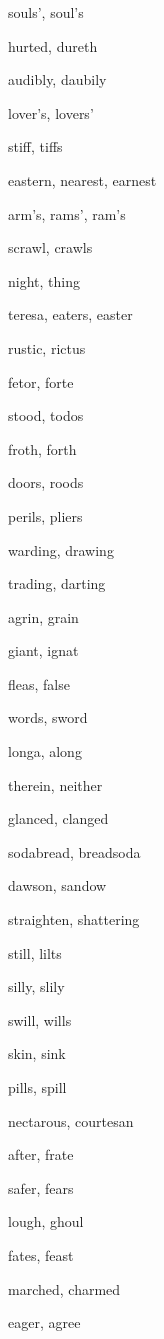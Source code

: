     \item souls', soul's
    \item hurted, dureth
    \item audibly, daubily
    \item lover's, lovers'
    \item stiff, tiffs
    \item eastern, nearest, earnest
    \item arm's, rams', ram's
    \item scrawl, crawls
    \item night, thing
    \item teresa, eaters, easter
    \item rustic, rictus
    \item fetor, forte
    \item stood, todos
    \item froth, forth
    \item doors, roods
    \item perils, pliers
    \item warding, drawing
    \item trading, darting
    \item agrin, grain
    \item giant, ignat
    \item fleas, false
    \item words, sword
    \item longa, along
    \item therein, neither
    \item glanced, clanged
    \item sodabread, breadsoda
    \item dawson, sandow
    \item straighten, shattering
    \item still, lilts
    \item silly, slily
    \item swill, wills
    \item skin, sink
    \item pills, spill
    \item nectarous, courtesan
    \item after, frate
    \item safer, fears
    \item lough, ghoul
    \item fates, feast
    \item marched, charmed
    \item eager, agree
